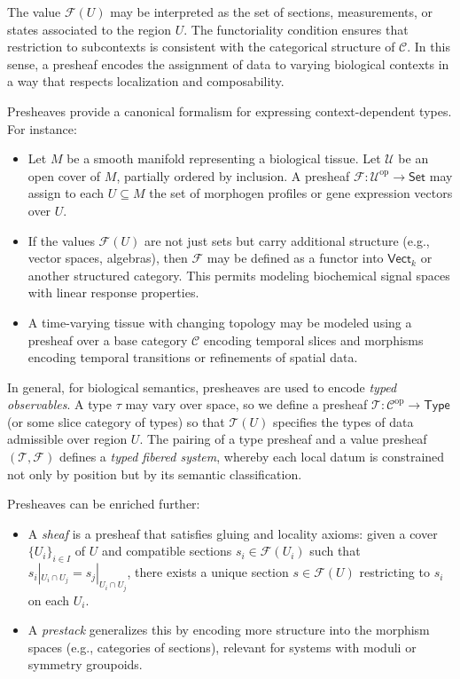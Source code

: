 The value $\mathscr{F}(U)$ may be interpreted as the set of sections, measurements, or states associated to the region $U$. The functoriality condition ensures that restriction to subcontexts is consistent with the categorical structure of $\mathcal{C}$. In this sense, a presheaf encodes the assignment of data to varying biological contexts in a way that respects localization and composability.

Presheaves provide a canonical formalism for expressing context-dependent types. For instance:
\begin{itemize}
  \item Let $M$ be a smooth manifold representing a biological tissue. Let $\mathcal{U}$ be an open cover of $M$, partially ordered by inclusion. A presheaf $\mathscr{F} : \mathcal{U}^{\mathrm{op}} \to \textsf{Set}$ may assign to each $U \subseteq M$ the set of morphogen profiles or gene expression vectors over $U$.
  
  \item If the values $\mathscr{F}(U)$ are not just sets but carry additional structure (e.g., vector spaces, algebras), then $\mathscr{F}$ may be defined as a functor into $\textsf{Vect}_k$ or another structured category. This permits modeling biochemical signal spaces with linear response properties.
  
  \item A time-varying tissue with changing topology may be modeled using a presheaf over a base category $\mathcal{C}$ encoding temporal slices and morphisms encoding temporal transitions or refinements of spatial data.
\end{itemize}

In general, for biological semantics, presheaves are used to encode \emph{typed observables}. A type $\tau$ may vary over space, so we define a presheaf $\mathscr{T} : \mathcal{C}^{\mathrm{op}} \to \textsf{Type}$ (or some slice category of types) so that $\mathscr{T}(U)$ specifies the types of data admissible over region $U$. The pairing of a type presheaf and a value presheaf $(\mathscr{T}, \mathscr{F})$ defines a \emph{typed fibered system}, whereby each local datum is constrained not only by position but by its semantic classification.

Presheaves can be enriched further:
\begin{itemize}
  \item A \emph{sheaf} is a presheaf that satisfies gluing and locality axioms: given a cover $\{ U_i \}_{i \in I}$ of $U$ and compatible sections $s_i \in \mathscr{F}(U_i)$ such that $s_i|_{U_i \cap U_j} = s_j|_{U_i \cap U_j}$, there exists a unique section $s \in \mathscr{F}(U)$ restricting to $s_i$ on each $U_i$.
  
  \item A \emph{prestack} generalizes this by encoding more structure into the morphism spaces (e.g., categories of sections), relevant for systems with moduli or symmetry groupoids.
\end{itemize}

